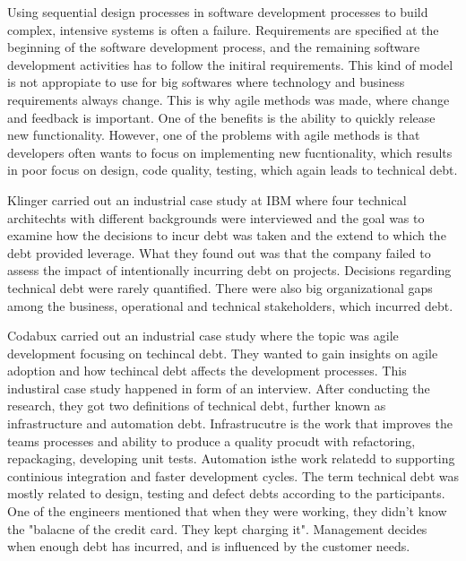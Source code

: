 Using sequential design processes in software development processes to build complex, intensive systems is often a failure. Requirements are specified at the beginning of the software development process, and the remaining software development activities has to follow the initiral requirements. This kind of model is not appropiate to use for big softwares where technology and business requirements always change. This is why agile methods was made, where change and feedback is important. One of the benefits is the ability to quickly release new functionality. However, one of the problems with agile methods is that developers often wants to focus on implementing new fucntionality, which results in poor focus on design, code quality, testing, which again leads to technical debt.  

Klinger carried out an industrial case study at IBM where four technical architechts with different backgrounds were interviewed and the goal was to examine how the decisions to incur debt was taken and the extend to which the debt provided leverage. What they found out was that the company failed to assess the impact of intentionally incurring debt on projects. Decisions regarding technical debt were rarely quantified. There were also big organizational gaps among the business, operational and technical stakeholders, which incurred debt.

Codabux carried out an industrial case study where the topic was agile development focusing on techincal debt. They wanted to gain insights on agile adoption and how techincal debt affects the development processes. This industiral case study happened in form of an interview. After conducting the research, they got two definitions of technical debt, further known as infrastructure and automation debt. Infrastrucutre is the work that improves the teams processes and ability to produce a quality procudt with refactoring, repackaging, developing unit tests. Automation isthe work relatedd to supporting continious integration and faster development cycles. The term technical debt was mostly related to design, testing and defect debts according to the participants. One of the engineers mentioned that when they were working, they didn't know the "balacne of the credit card. They kept charging it". Management decides when enough debt has incurred, and is influenced by the customer needs.











